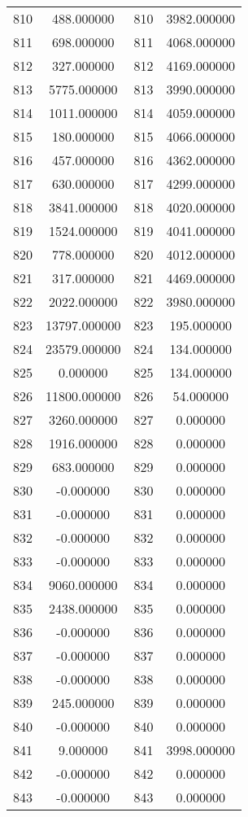 \documentclass[12pt]{article}
\begin{document}
\begin{longtable}{@{}cccc@{}}
810 & 488.000000 & 810 & 3982.000000 \\
811 & 698.000000 & 811 & 4068.000000 \\
812 & 327.000000 & 812 & 4169.000000 \\
813 & 5775.000000 & 813 & 3990.000000 \\
814 & 1011.000000 & 814 & 4059.000000 \\
815 & 180.000000 & 815 & 4066.000000 \\
816 & 457.000000 & 816 & 4362.000000 \\
817 & 630.000000 & 817 & 4299.000000 \\
818 & 3841.000000 & 818 & 4020.000000 \\
819 & 1524.000000 & 819 & 4041.000000 \\
820 & 778.000000 & 820 & 4012.000000 \\
821 & 317.000000 & 821 & 4469.000000 \\
822 & 2022.000000 & 822 & 3980.000000 \\
823 & 13797.000000 & 823 & 195.000000 \\
824 & 23579.000000 & 824 & 134.000000 \\
825 & 0.000000 & 825 & 134.000000 \\
826 & 11800.000000 & 826 & 54.000000 \\
827 & 3260.000000 & 827 & 0.000000 \\
828 & 1916.000000 & 828 & 0.000000 \\
829 & 683.000000 & 829 & 0.000000 \\
830 & -0.000000 & 830 & 0.000000 \\
831 & -0.000000 & 831 & 0.000000 \\
832 & -0.000000 & 832 & 0.000000 \\
833 & -0.000000 & 833 & 0.000000 \\
834 & 9060.000000 & 834 & 0.000000 \\
835 & 2438.000000 & 835 & 0.000000 \\
836 & -0.000000 & 836 & 0.000000 \\
837 & -0.000000 & 837 & 0.000000 \\
838 & -0.000000 & 838 & 0.000000 \\
839 & 245.000000 & 839 & 0.000000 \\
840 & -0.000000 & 840 & 0.000000 \\
841 & 9.000000 & 841 & 3998.000000 \\
842 & -0.000000 & 842 & 0.000000 \\
843 & -0.000000 & 843 & 0.000000 \\

\end{longtable}
\end{document}

